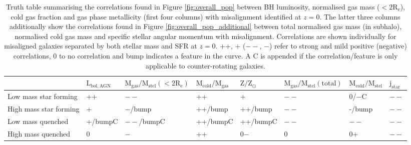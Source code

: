\begin{table}
\centering
\begin{tabular}{llllllll}
\hline
&  $\mathrm{L_{bol,AGN}}$ & $\mathrm{M_{gas} / M_{stel} (< 2R_e)}$ & $\mathrm{M_{cold} / M_{gas}}$ & $\mathrm{Z / Z_{\odot}}$ & $\mathrm{M_{gas}/M_{stel} (total)}$ & $\mathrm{M_{cold}/M_{stel}}$ & $\mathrm{j_{star}}$ \\
\hline
Low mass star forming & ++ & $--$ & ++ & + & $--$ & 0/$-$C & $--$ \\
High mass star forming & + & $-$/bump & ++/bump & ++/bump & $--$ & -/bump & $--$ \\
Low mass quenched & +/bumpC & $--$/bumpC & ++/bumpC & ++/bumpC & $--$ & $--$ & $--$ \\
High mass quenched & 0 & $-$ & ++ & 0$-$ & 0 & 0+ & $--$ \\
\end{tabular}
\caption{Truth table summarising the correlations found in Figure \ref{fig:overall_pop} between BH luminosity, normalised gas mass ($\mathrm{< 2R_e}$), cold gas fraction and gas phase metallicity (first four columns) with misalignment identified at $z=0$. The latter three columns additionally show the correlations found in Figure \ref{fig:overall_pop_additional} between total normalised gas mass (in subhalo), normalised cold gas mass and specific stellar angular momentum with misalignment. Correlations are shown individually for misaligned galaxies separated by both stellar mass and SFR at $z=0$. ++, + ($--$, $-$) refer to strong and mild positive (negative) correlations, 0 to no correlation and bump indicates a feature in the curve. A C is appended if the correlation/feature is only applicable to counter-rotating galaxies.}
\label{tab:truth}
\end{table}

